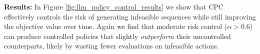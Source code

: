 \textbf{Results:}
In Figure \ref{fig:llm_policy_control_results} we show that CPC effectively controls the risk of generating infeasible sequences while still improving the objective value over time.
Again we find that moderate risk control ($\alpha > 0.6$) can produce controlled policies that slightly \textit{outperform} their uncontrolled counterparts, likely by wasting fewer evaluations on infeasible actions.
